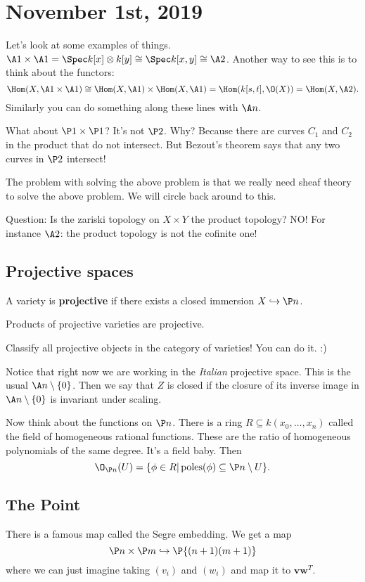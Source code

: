 \documentclass[12pt]{article}
\begin{document}
\section{November 1st, 2019}
Let's look at some examples of things. $\A1\times\A1=\Spec k[x]\otimes k[y]\cong\Spec k[x,y]\cong \A2$. Another way to see this 
is to think about the functors:
\[\Hom(X,\A1\times\A1)\cong\Hom(X,\A1)\times\Hom(X,\A1)=\Hom(k[s,t],\O(X))=\Hom(X,\A2).\]
Similarly you can do something along these lines with $\A n$.

What about $\P1\times\P1$? It's not $\P2$. Why? Because there are curves $C_1$ and $C_2$ in the product that do not intersect.
But Bezout's theorem says that any two curves in $\P2$ intersect!

The problem with solving the above problem is that we really need sheaf theory to solve the above problem. 
We will circle back around to this.

Question: Is the zariski topology on $X\times Y$ the product topology? NO! For instance $\A2$: the product topology is not the cofinite one!

\subsection{Projective spaces}
\begin{defn}
	A variety is \textbf{projective} if there exists a closed immersion $X\hookrightarrow \P n$.
\end{defn}
\begin{prop}
	Products of projective varieties are projective.
\end{prop}
\begin{prob}
	Classify all projective objects in the category of varieties! You can do it. :)
\end{prob}
\begin{rmk}
	Notice that right now we are working in the \textit{Italian} projective space. This is the usual $\A n\setminus\{0\}$.
	Then we say that $Z$ is closed if the closure of its inverse image in $\A n\setminus \{0\}$ is invariant under scaling.
\end{rmk}
Now think about the functions on $\P n$. There is a ring $R\subseteq k(x_0,\dots,x_n)$ called the field of homogeneous rational functions. These are the 
ratio of homogeneous polynomials of the same degree. It's a field baby. Then 
\[\O_{\P n}(U)=\{\phi\in R|\operatorname{poles}(\phi)\subseteq\P n\setminus U\}.\]

\subsection{The Point}
There is a famous map called the Segre embedding. We get a map 
\[\P n\times\P m\hookrightarrow \P {(n+1)(m+1)}\]
where we can just imagine taking $(v_i)$ and $(w_i)$ and map it to $\mathbf{v}\mathbf{w}^T$.
\end{document}
